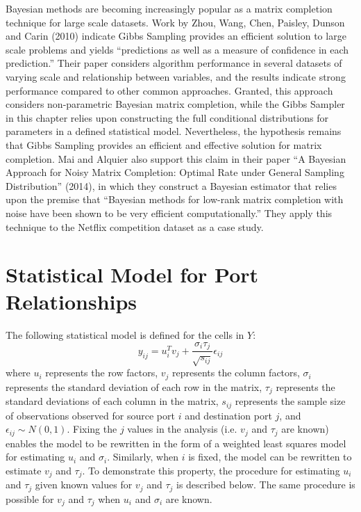 \documentclass[12pt,twoside]{dukestatscithesis}
\theoremstyle{definition}
\theoremstyle{definition}
\theoremstyle{definition}
\theoremstyle{remark}
\begin{document}
Bayesian methods are becoming increasingly popular as a matrix
completion technique for large scale datasets. Work by Zhou, Wang, Chen,
Paisley, Dunson and Carin (2010) indicate Gibbs Sampling provides an
efficient solution to large scale problems and yields ``predictions as
well as a measure of confidence in each prediction.'' Their paper
considers algorithm performance in several datasets of varying scale and
relationship between variables, and the results indicate strong
performance compared to other common approaches. Granted, this approach
considers non-parametric Bayesian matrix completion, while the Gibbs
Sampler in this chapter relies upon constructing the full conditional
distributions for parameters in a defined statistical model.
Nevertheless, the hypothesis remains that Gibbs Sampling provides an
efficient and effective solution for matrix completion. Mai and Alquier
also support this claim in their paper ``A Bayesian Approach for Noisy
Matrix Completion: Optimal Rate under General Sampling Distribution''
(2014), in which they construct a Bayesian estimator that relies upon
the premise that ``Bayesian methods for low-rank matrix completion with
noise have been shown to be very efficient computationally.'' They apply
this technique to the Netflix competition dataset as a case study.

\section{Statistical Model for Port
Relationships}\label{statistical-model-for-port-relationships}

The following statistical model is defined for the cells in \(Y\):
\[y_{ij} = u_i^Tv_j + \frac{\sigma_i \tau_j}{\sqrt{s_{ij}}}\epsilon_{ij}\]
where \(u_i\) represents the row factors, \(v_j\) represents the column
factors, \(\sigma_i\) represents the standard deviation of each row in
the matrix, \(\tau_j\) represents the standard deviations of each column
in the matrix, \(s_{ij}\) represents the sample size of observations
observed for source port \(i\) and destination port \(j\), and
\(\epsilon_{ij} \sim N(0,1)\). Fixing the \(j\) values in the analysis
(i.e. \(v_j\) and \(\tau_j\) are known) enables the model to be
rewritten in the form of a weighted least squares model for estimating
\(u_i\) and \(\sigma_i\). Similarly, when \(i\) is fixed, the model can
be rewritten to estimate \(v_j\) and \(\tau_j\). To demonstrate this
property, the procedure for estimating \(u_i\) and \(\tau_j\) given
known values for \(v_j\) and \(\tau_j\) is described below. The same
procedure is possible for \(v_j\) and \(\tau_j\) when \(u_i\) and
\(\sigma_i\) are known.
\end{document}
